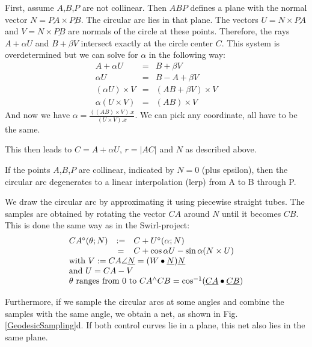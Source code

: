 \documentclass[journal, letterpaper]{IEEEtran}
\begin{document}
First, assume $A$,$B$,$P$ are not collinear. Then $ABP$ defines a plane with the normal vector $N=\underline{PA} \times \underline{PB}$. The circular arc lies in that plane. The vectors $U=N \times \underline{PA}$ and $V=N \times \underline{PB}$ are normals of the circle at these points.
Therefore, the rays $A+\alpha U$ and $B+\beta V$ intersect exactly at the circle center $C$.
This system is overdetermined but we can solve for $\alpha$ in the following way:
\begin{equation}
\begin{array}{rcl}
A + \alpha U &=& B + \beta V \\
\alpha U &=& B-A+\beta V \\
(\alpha U) \times V &=& (AB+\beta V) \times V \\
\alpha (U\times V) &=& (AB) \times V
\end{array}
\label{eq:CircArc}
\end{equation}
And now we have $\alpha = \frac{ ((AB)\times V).x }{ (U \times V).x}$. We can pick any coordinate, all have to be the same.

This then leads to $C=A + \alpha U$, $r=|AC|$ and $N$ as described above.

If the points $A$,$B$,$P$ are collinear, indicated by $N=0$ (plus epsilon), then the circular arc degenerates to a linear interpolation (lerp) from A to B through P.

We draw the circular arc by approximating it using piecewise straight tubes. The samples are obtained by rotating the vector $CA$ around $N$ until it becomes $CB$. This is done the same way as in the Swirl-project:
\begin{equation}
\begin{array}{lcl}
 CA^{\circ}(\theta; N) &:=& C + U^{\circ}(\alpha; N) \\
                        & =& C + \cos \alpha U - \sin \alpha (N \times U)\\
 \multicolumn{3}{l}{\text{with } V := CA\angle\underline{N} = (W\bullet\underline{N})\underline{N}} \\
 \multicolumn{3}{l}{\text{and } U = CA-V} \\
 \multicolumn{3}{l}{\theta \text{ ranges from } 0 \text{ to } CA^{\wedge}CB=\cos^{-1}(\underline{CA}\bullet\underline{CB})}
\end{array}
\label{eq:Rot}
\end{equation}

Furthermore, if we sample the circular arcs at some angles and combine the samples with the same angle, we obtain a net, as shown in Fig.\ref{GeodesicSampling}d. If both control curves lie in a plane, this net also lies in the same plane.
\end{document}
